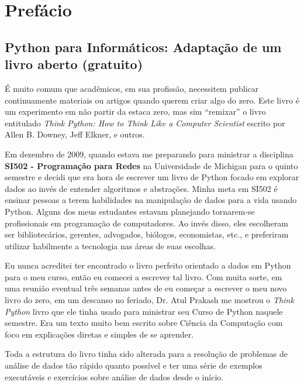 
\chapter{Prefácio}

\section*{Python para Informáticos: Adaptação de um livro aberto (gratuito)}

É muito comum que acadêmicos, em sua profissão, necessitem publicar continuamente 
materiais ou artigos quando querem criar algo do zero. 
Este livro é um experimento em não partir da estaca zero, mas sim ``remixar''
o livro entitulado \emph{Think Python: How to Think Like
a Computer Scientist} escrito por Allen B. Downey, Jeff Elkner, e outros.

Em dezembro de 2009, quando estava me preparando para ministrar a disciplina
{\bf SI502 - Programação para Redes} na Universidade de Michigan
para o quinto semestre e decidi que era hora de escrever um livro de Python 
focado em explorar dados ao invés de entender algoritmos e 
abstrações.
Minha meta em SI502 é ensinar pessoas a terem habilidades na manipulação de dados 
para a vida usando Python.  Alguns dos meus estudantes estavam planejando tornarem-se 
profissionais em programação de computadores.  Ao invés disso, eles
escolheram ser bibliotecários, gerentes, advogados, biólogos, economistas, etc., 
e preferiram utilizar habilmente a tecnologia nas áreas de suas escolhas.

Eu nunca acreditei ter encontrado o livro perfeito orientado a dados em Python
para o meu curso, então eu comecei a escrever tal livro.  Com muita sorte, em 
uma reunião eventual três semanas antes
de eu começar a escrever o meu novo livro do zero, em um descanso no feriado, 
Dr. Atul Prakash me mostrou o \emph{Think Python} livro que ele tinha
usado para ministrar seu Curso de Python naquele semestre.
Era um texto muito bem escrito sobre Ciência da Computação com foco em
explicações diretas e simples de se aprender.

Toda a estrutura do livro
tinha sido alterada para a resolução de problemas de análise de dados tão rápido quanto
possível e ter uma série de exemplos executáveis e exercícios sobre análise de dados
desde o início.

